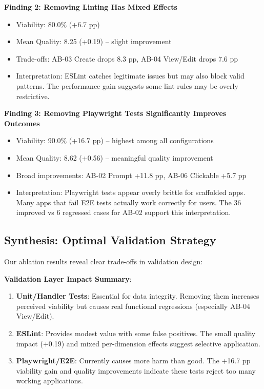 \documentclass{article}
\begin{document}
\textbf{Finding 2: Removing Linting Has Mixed Effects}
\begin{itemize}
\item Viability: 80.0\% (+6.7 pp)
\item Mean Quality: 8.25 (+0.19) -- slight improvement
\item Trade-offs: AB-03 Create drops 8.3 pp, AB-04 View/Edit drops 7.6 pp
\item Interpretation: ESLint catches legitimate issues but may also block valid patterns. The performance gain suggests some lint rules may be overly restrictive.
\end{itemize}

\textbf{Finding 3: Removing Playwright Tests Significantly Improves Outcomes}
\begin{itemize}
\item Viability: 90.0\% (+16.7 pp) -- highest among all configurations
\item Mean Quality: 8.62 (+0.56) -- meaningful quality improvement
\item Broad improvements: AB-02 Prompt +11.8 pp, AB-06 Clickable +5.7 pp
\item Interpretation: Playwright tests appear overly brittle for scaffolded apps. Many apps that fail E2E tests actually work correctly for users. The 36 improved vs 6 regressed cases for AB-02 support this interpretation.
\end{itemize}

\subsection{Synthesis: Optimal Validation Strategy}

Our ablation results reveal clear trade-offs in validation design:

\textbf{Validation Layer Impact Summary}:
\begin{enumerate}
\item \textbf{Unit/Handler Tests}: Essential for data integrity. Removing them increases perceived viability but causes real functional regressions (especially AB-04 View/Edit).
\item \textbf{ESLint}: Provides modest value with some false positives. The small quality impact (+0.19) and mixed per-dimension effects suggest selective application.
\item \textbf{Playwright/E2E}: Currently causes more harm than good. The +16.7 pp viability gain and quality improvements indicate these tests reject too many working applications.
\end{enumerate}
\end{document}
